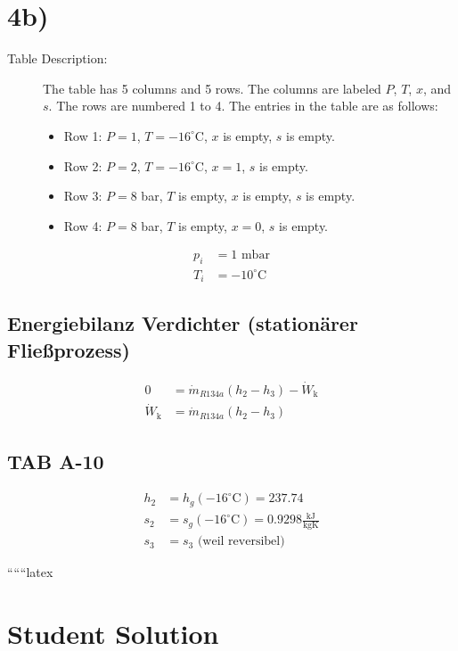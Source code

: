 

\section*{4b)}

\begin{description}
    \item[Table Description:] The table has 5 columns and 5 rows. The columns are labeled $P$, $T$, $x$, and $s$. The rows are numbered 1 to 4. The entries in the table are as follows:
    \begin{itemize}
        \item Row 1: $P = 1$, $T = -16^\circ$C, $x$ is empty, $s$ is empty.
        \item Row 2: $P = 2$, $T = -16^\circ$C, $x = 1$, $s$ is empty.
        \item Row 3: $P = 8$ bar, $T$ is empty, $x$ is empty, $s$ is empty.
        \item Row 4: $P = 8$ bar, $T$ is empty, $x = 0$, $s$ is empty.
    \end{itemize}
\end{description}

\begin{align*}
    p_i &= 1 \text{ mbar} \\
    T_i &= -10^\circ \text{C}
\end{align*}

\subsection*{Energiebilanz Verdichter (stationärer Fließprozess)}

\begin{align*}
    0 &= \dot{m}_{R134a} (h_2 - h_3) - \dot{W}_\text{k} \\
    \dot{W}_\text{k} &= \dot{m}_{R134a} (h_2 - h_3)
\end{align*}

\subsection*{TAB A-10}

\begin{align*}
    h_2 &= h_g (-16^\circ \text{C}) = 237.74 \\
    s_2 &= s_g (-16^\circ \text{C}) = 0.9298 \frac{\text{kJ}}{\text{kgK}} \\
    s_3 &= s_3 \text{ (weil reversibel)}
\end{align*}

``````latex


\section*{Student Solution}